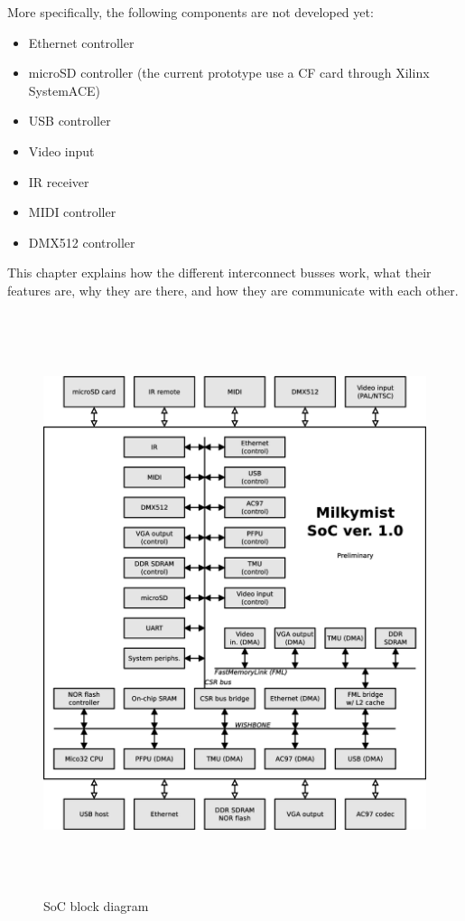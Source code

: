 \documentclass[a4paper,11pt]{kthesis}
\begin{document}
More specifically, the following components are not developed yet:
\begin{itemize}
\item Ethernet controller
\item microSD controller (the current prototype use a CF card through Xilinx SystemACE)
\item USB controller
\item Video input
\item IR receiver
\item MIDI controller
\item DMX512 controller
\end{itemize}

This chapter explains how the different interconnect busses work, what their features are, why they are there, and how they are communicate with each other.

\begin{figure}
\centering
\includegraphics[height=170mm]{soc_architecture.eps}
\caption{SoC block diagram}
\label{fig:block}
\end{figure}
\end{document}
